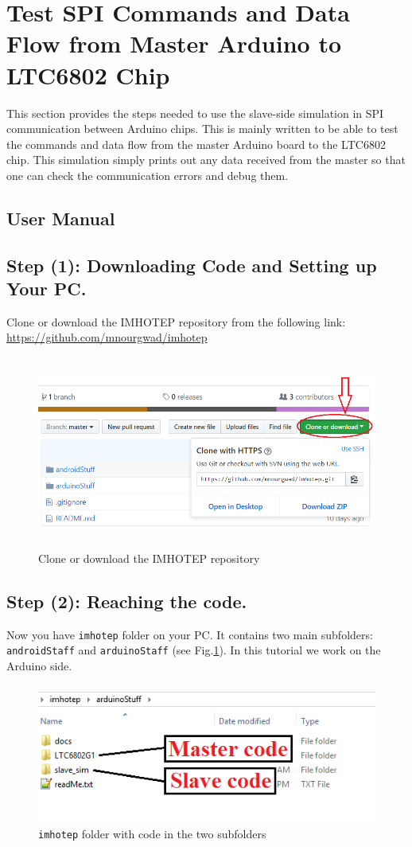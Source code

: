 \section{Test SPI Commands and Data Flow from Master Arduino to LTC6802 Chip}
This section provides the steps needed to use the slave-side simulation in SPI communication between Arduino chips. This is mainly written to be able to test the commands and data flow from the master Arduino board to the LTC6802 chip. This simulation simply prints out any data received from the master so that one can check the communication errors and debug them.

\subsection{User Manual}\label{sec:userMan}
\subsection{Step (1): Downloading Code and Setting up Your PC.}
Clone or download the IMHOTEP repository from the following link:\\
\url{https://github.com/mnourgwad/imhotep}
\begin{figure}[h]
\centering
\includegraphics[width=13.82cm,height=6.33cm]{figures/image6}
\caption{Clone or download the IMHOTEP repository}
\end{figure}

\subsection{Step (2): Reaching the code.}
Now you have \texttt{imhotep} folder on your PC. It contains two main subfolders: \texttt{androidStaff}
 and \texttt{arduinoStaff} (see Fig.\ref{fig:projectfolders}). In this tutorial we work on the Arduino side.
\begin{figure}[h]
    \centering
    \includegraphics[width=11.55cm,height=4.56cm]{figures/image7}
    \caption{\texttt{imhotep} folder with code in the two subfolders}
    \label{fig:projectfolders}
\end{figure}

